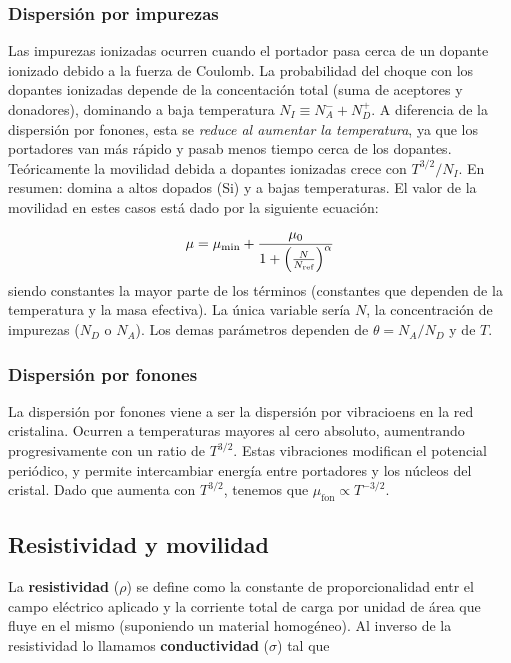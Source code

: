 \subsubsection{Dispersión por impurezas}

Las impurezas ionizadas ocurren cuando el portador pasa cerca de un dopante ionizado debido a la fuerza de Coulomb. La probabilidad del choque con los dopantes ionizadas depende de la concentación total (suma de aceptores y donadores), dominando a baja temperatura $N_I \equiv N_A^- + N_D^+$. A diferencia de la dispersión por fonones, esta se \textit{reduce al aumentar la temperatura}, ya que los portadores van más rápido y pasab menos tiempo cerca de los dopantes. Teóricamente la movilidad debida a dopantes ionizadas crece con $T^{3/2}/N_I$. En resumen: domina a altos dopados (Si) y a bajas temperaturas. El valor de la movilidad en estes casos está dado por la siguiente ecuación:

\begin{equation}
	\mu = \mu_{\min} + \frac{\mu_0}{1+\left( \frac{N}{N_{\text{ref}}} \right)^{\alpha}}
\end{equation}
siendo constantes la mayor parte de los términos (constantes que dependen de la temperatura y la masa efectiva). La única variable sería $N$, la concentración de impurezas ($N_D$ o $N_A$). Los demas parámetros dependen de $\theta=N_A/N_D$ y de $T$.

\subsubsection{Dispersión por fonones}

La dispersión por fonones viene a ser la dispersión por vibracioens en la red cristalina. Ocurren a temperaturas mayores al cero absoluto, aumentrando progresivamente con un ratio de $T^{3/2}$. Estas vibraciones modifican el potencial periódico, y permite intercambiar energía entre portadores y los núcleos del cristal. Dado que aumenta con $T^{3/2}$, tenemos que $\mu_{\text{fon}} \propto T^{-3/2}$.


\subsection{Resistividad y movilidad}

La \textbf{resistividad} ($\rho$) se define como la constante de proporcionalidad entr el campo eléctrico aplicado y la corriente total de carga por unidad de área que fluye en el mismo (suponiendo un material homogéneo). Al inverso de la resistividad lo llamamos \textbf{conductividad} ($\sigma$) tal que

